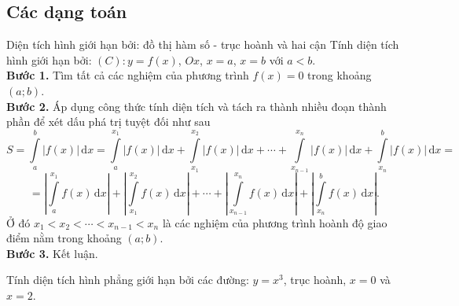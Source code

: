 \subsection{Các dạng toán}
\begin{dang}{Diện tích hình giới hạn bởi: đồ thị hàm số - trục hoành và hai cận}
	Tính diện tích hình giới hạn bởi: $(C): y=f(x)$, $Ox$, $x=a$, $x=b$ với $a<b$.\\
	{\bf Bước 1.} Tìm tất cả các nghiệm của phương trình $f(x)=0$ trong khoảng $(a;b)$.\\
	{\bf Bước 2.} Áp dụng công thức tính diện tích và tách ra thành nhiều đoạn thành phần để xét dấu phá trị tuyệt đối như sau
	$$S=\displaystyle\int\limits_a^b\left| f(x)\right|\mathrm{\,d}x=\displaystyle\int\limits_a^{x_1}\left| f(x)\right|\mathrm{\,d}x+\displaystyle\int\limits_{x_1}^{x_2}\left| f(x)\right|\mathrm{\,d}x+\cdots+\displaystyle\int\limits_{x_{n-1}}^{x_n}\left| f(x)\right|\mathrm{\,d}x+\displaystyle\int\limits_{x_n}^b\left| f(x)\right|\mathrm{\,d}x=$$
	$$=\left|\displaystyle\int\limits_a^{x_1} f(x)\mathrm{\,d}x\right|+\left|\displaystyle\int\limits_{x_1}^{x_2} f(x)\mathrm{\,d}x\right|+\cdots+\left|\displaystyle\int\limits_{x_{n-1}}^{x_n} f(x)\mathrm{\,d}x\right|+\left|\displaystyle\int\limits_{x_n}^b f(x)\mathrm{\,d}x\right|.$$
	Ở đó $x_1<x_2<\cdots<x_{n-1}<x_n$ là các nghiệm của phương trình hoành độ giao điểm nằm trong khoảng $(a;b)$.\\
	{\bf Bước 3.} Kết luận.
\end{dang}
\begin{vd}%
	Tính diện tích hình phẳng giới hạn bởi các đường: $y=x^3$, trục hoành, $x=0$ và $x=2$. 
\end{vd}

